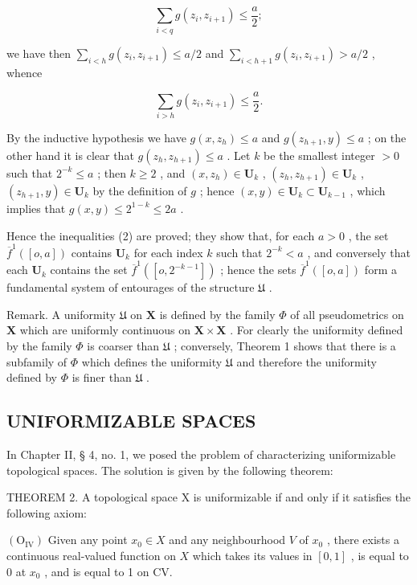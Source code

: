 \[
\sum_ {i <   q} g (z _ {i}, z _ {i + 1}) \leqslant \frac {a}{2};
\]

we have then \(\sum_{i < h} g(z_i, z_{i+1}) \leqslant a/2\) and \(\sum_{i < h+1} g(z_i, z_{i+1}) > a/2\) , whence

\[
\sum_ {i > h} g (z _ {i}, z _ {i + 1}) \leqslant \frac {a}{2}.
\]

By the inductive hypothesis we have \(g(x, z_h) \leqslant a\) and \(g(z_{h+1}, y) \leqslant a\) ; on the other hand it is clear that \(g(z_h, z_{h+1}) \leqslant a\) . Let \(k\) be the smallest integer \(> 0\) such that \(2^{-k} \leqslant a\) ; then \(k \geqslant 2\) , and \((x, z_h) \in \mathbf{U}_k\) , \((z_h, z_{h+1}) \in \mathbf{U}_k\) , \((z_{h+1}, y) \in \mathbf{U}_k\) by the definition of \(g\) ; hence \((x, y) \in \mathbf{U}_k \subset \mathbf{U}_{k-1}\) , which implies that \(g(x, y) \leqslant 2^{1-k} \leqslant 2a\) .

Hence the inequalities (2) are proved; they show that, for each \(a > 0\) , the set \(\overline{f}^{1}([o, a])\) contains \(\mathbf{U}_{k}\) for each index \(k\) such that \(2^{-k} < a\) , and conversely that each \(\mathbf{U}_{k}\) contains the set \(\overline{f}^{1}([o, 2^{-k-1}])\) ; hence the sets \(\overline{f}^{1}([o, a])\) form a fundamental system of entourages of the structure \(\mathfrak{U}\) .

Remark. A uniformity \(\mathfrak{U}\) on \(\mathbf{X}\) is defined by the family \(\Phi\) of all pseudometrics on \(\mathbf{X}\) which are uniformly continuous on \(\mathbf{X} \times \mathbf{X}\) . For clearly the uniformity defined by the family \(\Phi\) is coarser than \(\mathfrak{U}\) ; conversely, Theorem 1 shows that there is a subfamily of \(\Phi\) which defines the uniformity \(\mathfrak{U}\) and therefore the uniformity defined by \(\Phi\) is finer than \(\mathfrak{U}\) .

\subsection{UNIFORMIZABLE SPACES}

In Chapter II, § 4, no. 1, we posed the problem of characterizing uniformizable topological spaces. The solution is given by the following theorem:

THEOREM 2. A topological space X is uniformizable if and only if it satisfies the following axiom:

\((\mathrm{O}_{\mathrm{IV}})\) Given any point \(x_0 \in X\) and any neighbourhood \(V\) of \(x_0\) , there exists a continuous real-valued function on \(X\) which takes its values in \([0,1]\) , is equal to 0 at \(x_0\) , and is equal to 1 on CV.

